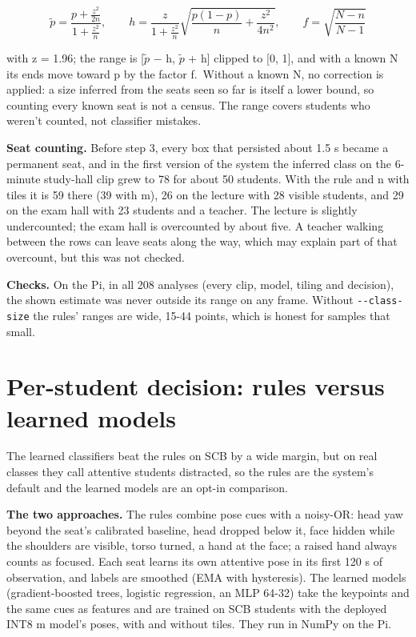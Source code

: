 \begin{equation}
\tilde p = \frac{p + \frac{z^2}{2n}}{1 + \frac{z^2}{n}}, \qquad h = \frac{z}{1 + \frac{z^2}{n}} \sqrt{\frac{p(1-p)}{n} + \frac{z^2}{4n^2}}, \qquad f = \sqrt{\frac{N - n}{N - 1}}
\end{equation}

with z = 1.96; the range is {[}\ensuremath{\tilde{p}} − h, \ensuremath{\tilde{p}} + h{]} clipped to {[}0, 1{]}, and with a known N its ends move toward p by the factor f.~Without a known N, no correction is applied: a size inferred from the seats seen so far is itself a lower bound, so counting every known seat is not a census. The range covers students who weren't counted, not classifier mistakes.

\textbf{Seat counting.} Before step 3, every box that persisted about 1.5 s became a permanent seat, and in the first version of the system the inferred class on the 6-minute study-hall clip grew to 78 for about 50 students. With the rule and n with tiles it is 59 there (39 with m), 26 on the lecture with 28 visible students, and 29 on the exam hall with 23 students and a teacher. The lecture is slightly undercounted; the exam hall is overcounted by about five. A teacher walking between the rows can leave seats along the way, which may explain part of that overcount, but this was not checked.

\textbf{Checks.} On the Pi, in all 208 analyses (every clip, model, tiling and decision), the shown estimate was never outside its range on any frame. Without \texttt{-\/-class-size} the rules' ranges are wide, 15-44 points, which is honest for samples that small.

\section{Per-student decision: rules versus learned models}

The learned classifiers beat the rules on SCB by a wide margin, but on real classes they call attentive students distracted, so the rules are the system's default and the learned models are an opt-in comparison.

\textbf{The two approaches.} The rules combine pose cues with a noisy-OR: head yaw beyond the seat's calibrated baseline, head dropped below it, face hidden while the shoulders are visible, torso turned, a hand at the face; a raised hand always counts as focused. Each seat learns its own attentive pose in its first 120 s of observation, and labels are smoothed (EMA with hysteresis). The learned models (gradient-boosted trees, logistic regression, an MLP 64-32) take the keypoints and the same cues as features and are trained on SCB students with the deployed INT8 m model's poses, with and without tiles. They run in NumPy on the Pi.

